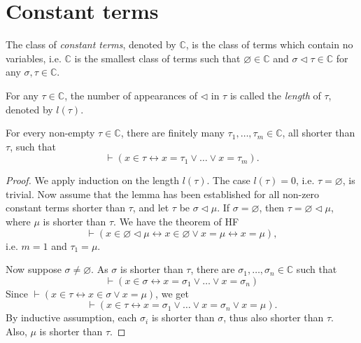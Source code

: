 \section{Constant terms}

\begin{definition}
    \label{def:C+C.length}
    \leanok
    The class of \textit{constant terms}, denoted by $\mathbb{C}$, is the class of terms which
    contain no variables, i.e. $\mathbb{C}$ is the smallest class of terms such that 
    $\varnothing \in \mathbb{C}$ and 
    $\sigma \lhd \tau \in \mathbb{C}$ for any $\sigma, \tau \in \mathbb{C}$.

    For any $\tau \in \mathbb{C}$, the number of appearances of $\lhd$ in $\tau$ is called the
    \textit{length} of $\tau$, denoted by $l(\tau)$.
\end{definition}

\begin{lemma}
    \label{lem:C.exists_finset_shorter_and_mem_iff_iSup}
    \leanok
    For every non-empty $\tau \in \mathbb{C}$, there are finitely many 
    $\tau_1, \ldots, \tau_m \in \mathbb{C}$, all shorter than $\tau$, such that
    $$
    \vdash (x \in \tau \leftrightarrow x = \tau_1 \lor \ldots \lor x = \tau_m).
    $$
\end{lemma}

\begin{proof}
    \leanok
    We apply induction on the length $l(\tau)$.
    The case $l(\tau) = 0$, i.e. $\tau = \varnothing$, is trivial.
    Now assume that the lemma has been established for all non-zero constant terms shorter 
    than $\tau$, and let $\tau$ be $\sigma \lhd \mu$.
    If $\sigma = \varnothing$, then $\tau = \varnothing \lhd \mu$, 
    where $\mu$ is shorter than $\tau$.
    We have the theorem of HF
    $$
    \vdash (x \in \varnothing \lhd \mu \leftrightarrow x \in \varnothing \lor x=\mu
    \leftrightarrow x=\mu),
    $$
    i.e. $m=1$ and $\tau_1 = \mu$. 
   
    Now suppose $\sigma \neq \varnothing$. As $\sigma$ is shorter than $\tau$,
    there are $\sigma_1, \ldots, \sigma_n \in \mathbb{C}$ such that
    $$
    \vdash (x \in \sigma \leftrightarrow x=\sigma_1 \lor \ldots \lor x=\sigma_n)
    $$
    Since $\vdash (x \in \tau \leftrightarrow x \in \sigma \lor x=\mu)$, we get
    $$
    \vdash (x \in \tau \leftrightarrow x=\sigma_1 \lor \ldots \lor x=\sigma_n \lor x=\mu).
    $$
    By inductive assumption, 
    each $\sigma_i$ is shorter than $\sigma$, thus also shorter than $\tau$. 
    Also, $\mu$ is shorter than $\tau$.
\end{proof}

